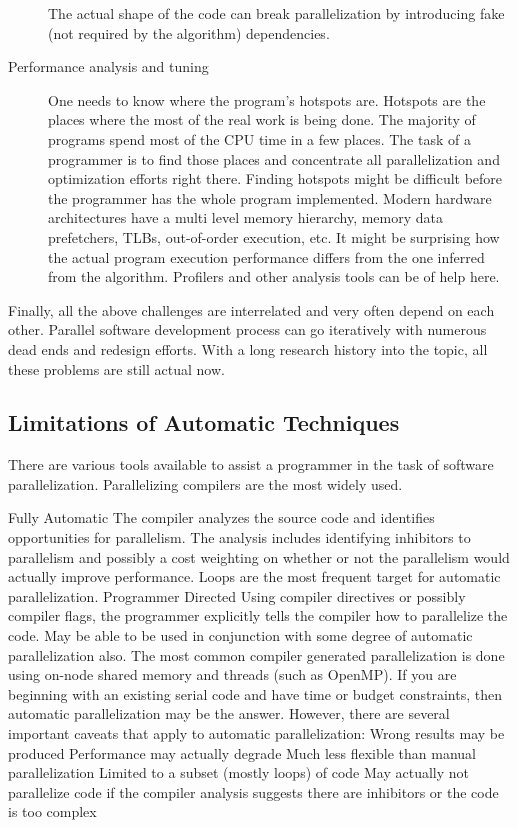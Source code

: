\begin{description}
The actual shape of the code can break parallelization by introducing fake (not required by the algorithm) dependencies.
\item[Performance analysis and tuning] One needs to know where the program's hotspots are. Hotspots are the places where the most of the real work is being done. The majority of programs spend most of the CPU time in a few places. The task of a programmer is to find those places and concentrate all parallelization and optimization efforts right there. Finding hotspots might be difficult before the programmer has the whole program implemented. Modern hardware architectures have a multi level memory hierarchy, memory data prefetchers, TLBs, out-of-order execution, etc. It might be surprising how the actual program execution performance differs from the one inferred from the algorithm. Profilers and other analysis tools can be of help here.
\end{description}
\quad Finally, all the above challenges are interrelated and very often depend on each other. Parallel software development process can go iteratively with numerous dead ends and redesign efforts. With a long research history into the topic, all these problems are still actual now.
\subsection{Limitations of Automatic Techniques}
\quad There are various tools available to assist a programmer in the task of software parallelization. Parallelizing compilers are the most widely used.

Fully Automatic
The compiler analyzes the source code and identifies opportunities for parallelism.
The analysis includes identifying inhibitors to parallelism and possibly a cost weighting on whether or not the parallelism would actually improve performance. Loops are the most frequent target for automatic parallelization. Programmer Directed 
Using compiler directives or possibly compiler flags, the programmer explicitly tells the compiler how to parallelize the code. May be able to be used in conjunction with some degree of automatic parallelization also. The most common compiler generated parallelization is done using on-node shared memory and threads (such as OpenMP). If you are beginning with an existing serial code and have time or budget constraints, then automatic parallelization may be the answer. However, there are several important caveats that apply to automatic parallelization: Wrong results may be produced Performance may actually degrade Much less flexible than manual parallelization Limited to a subset (mostly loops) of code May actually not parallelize code if the compiler analysis suggests there are inhibitors or the code is too complex 

